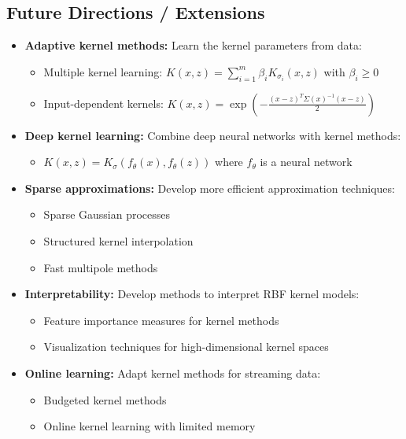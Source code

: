 \documentclass[11pt]{article}
\begin{document}
\subsection{Future Directions / Extensions}
\begin{itemize}
  \item \textbf{Adaptive kernel methods:} Learn the kernel parameters from data:
    \begin{itemize}
      \item Multiple kernel learning: $K(x,z) = \sum_{i=1}^m \beta_i K_{\sigma_i}(x,z)$ with $\beta_i \geq 0$
      \item Input-dependent kernels: $K(x,z) = \exp(-\frac{(x-z)^T\Sigma(x)^{-1}(x-z)}{2})$
    \end{itemize}
  
  \item \textbf{Deep kernel learning:} Combine deep neural networks with kernel methods:
    \begin{itemize}
      \item $K(x,z) = K_\sigma(f_\theta(x), f_\theta(z))$ where $f_\theta$ is a neural network
    \end{itemize}
  
  \item \textbf{Sparse approximations:} Develop more efficient approximation techniques:
    \begin{itemize}
      \item Sparse Gaussian processes
      \item Structured kernel interpolation
      \item Fast multipole methods
    \end{itemize}
  
  \item \textbf{Interpretability:} Develop methods to interpret RBF kernel models:
    \begin{itemize}
      \item Feature importance measures for kernel methods
      \item Visualization techniques for high-dimensional kernel spaces
    \end{itemize}
  
  \item \textbf{Online learning:} Adapt kernel methods for streaming data:
    \begin{itemize}
      \item Budgeted kernel methods
      \item Online kernel learning with limited memory
    \end{itemize}
\end{itemize}
\end{document}
